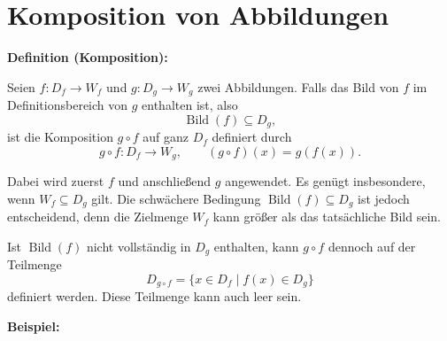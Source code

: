 \section{Komposition von Abbildungen}

\textbf{Definition (Komposition):}

Seien $f:D_f\rightarrow W_f$ und $g:D_g\rightarrow W_g$
zwei Abbildungen. Falls das Bild von $f$ im Definitionsbereich
von $g$ enthalten ist, also
\[
\operatorname{Bild}(f)\subseteq D_g,
\]
ist die Komposition $g\circ f$ auf ganz $D_f$ definiert durch
\[
g\circ f:D_f\rightarrow W_g,
\qquad (g\circ f)(x)=g(f(x)).
\]

Dabei wird zuerst $f$ und anschließend $g$ angewendet.
Es genügt insbesondere, wenn $W_f\subseteq D_g$ gilt.
Die schwächere Bedingung $\operatorname{Bild}(f)\subseteq D_g$
ist jedoch entscheidend, denn die Zielmenge $W_f$ kann
größer als das tatsächliche Bild sein.

\begin{center}
	
\end{center}

Ist $\operatorname{Bild}(f)$ nicht vollständig in $D_g$ enthalten,
kann $g\circ f$ dennoch auf der Teilmenge
\[
D_{g\circ f}=\{x\in D_f\mid f(x)\in D_g\}
\]
definiert werden. Diese Teilmenge kann auch leer sein.

\textbf{Beispiel:}

